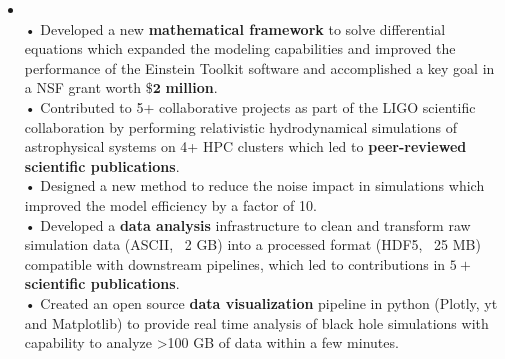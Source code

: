 \documentclass[11pt,a4paper,sans]{moderncv}       %
\begin{document}
\begin{itemize}
\item{
{
\vspace{4pt}\\
• Developed a new \textbf{mathematical framework} to solve differential equations which expanded the modeling capabilities and improved the performance of the Einstein Toolkit software and accomplished a key goal in a NSF grant worth $\mathbf{\$2}$\textbf{ million}. 
\vspace{4pt}\\
• Contributed to 5+ collaborative projects as part of the LIGO scientific collaboration by performing relativistic hydrodynamical simulations of astrophysical systems on 4+ HPC clusters which led to \textbf{ peer-reviewed scientific publications}.
\vspace{4pt}\\
• Designed a new method to reduce the noise impact in simulations which improved the model efficiency by a factor of 10. 
\vspace{4pt}\\
• Developed a \textbf{data analysis} infrastructure to clean and transform raw simulation data (ASCII, ~2 GB) into a processed format (HDF5, ~25 MB) compatible with downstream pipelines, which led to contributions in  \textbf{$5+$ scientific publications}. 
\vspace{4pt}\\ 
• Created an open source \textbf{data visualization} pipeline in python (Plotly, yt and Matplotlib) to provide real time analysis of black hole simulations with capability to analyze >100 GB of data within a few minutes.}}


\end{itemize}
\end{document}
